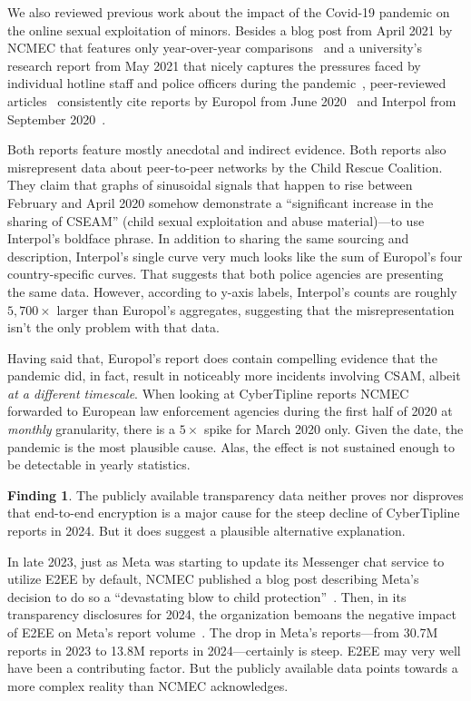 \documentclass[anonymous,nonacm,screen,12pt]{acmart}
\newcommand\V[1]{{#1}}
\newcommand\V[1]{\textsc{\MakeLowercase{#1}}}
\theoremstyle{definition}
\newtheorem{finding}{Finding}
\begin{document}
We also reviewed previous work about the impact of the Covid-19 pandemic on the
online sexual exploitation of minors. Besides a blog post from April 2021 by
\V{NCMEC} that features only year-over-year comparisons~\cite{ODonnell2021} and
a university's research report from May 2021 that nicely captures the pressures
faced by individual hotline staff and police officers during the
pandemic~\cite{SalterWong2021}, peer-reviewed articles~\cite{Dabrowska2021,
Haney2021b, SalterWoodlockea2023} consistently cite reports by Europol from June
2020~\cite{Europol2020} and Interpol from September 2020~\cite{Interpol2020}.

Both reports feature mostly anecdotal and indirect evidence. Both reports also
misrepresent data about peer-to-peer networks by the Child Rescue Coalition.
They claim that graphs of sinusoidal signals that happen to rise between
February and April 2020 somehow demonstrate a ``significant increase in the
sharing of \V{CSEAM}'' (child sexual exploitation and abuse material)---to use
Interpol's boldface phrase. In addition to sharing the same sourcing and
description, Interpol's single curve very much looks like the sum of Europol's
four country-specific curves. That suggests that both police agencies are
presenting the same data. However, according to y-axis labels, Interpol's counts
are roughly $5,700\times$ larger than Europol's aggregates, suggesting that the
misrepresentation isn't the only problem with that data.

Having said that, Europol's report does contain compelling evidence that the
pandemic did, in fact, result in noticeably more incidents involving \V{CSAM},
albeit \emph{at a different timescale}. When looking at CyberTipline reports
\V{NCMEC} forwarded to European law enforcement agencies during the first half
of 2020 at \emph{monthly} granularity, there is a $5\times$ spike for March 2020
only. Given the date, the pandemic is the most plausible cause. Alas, the effect
is not sustained enough to be detectable in yearly statistics.


\begin{finding}
The publicly available transparency data neither proves nor disproves that
end-to-end encryption is a major cause for the steep decline of CyberTipline
reports in 2024. But it does suggest a plausible alternative explanation.
\end{finding}

\noindent{}In late 2023, just as Meta was starting to update its Messenger chat
service to utilize \V{E2EE} by default, \V{NCMEC} published a blog post
describing Meta's decision to do so a ``devastating blow to child
protection''~\cite{NCMEC2023}. Then, in its transparency disclosures for 2024,
the organization bemoans the negative impact of \V{E2EE} on Meta's report
volume~\cite{NcmecCyberTipline2024, NcmecOjjdp2024}. The drop in Meta's
reports---from 30.7\V{M} reports in 2023 to 13.8\V{M} reports in
2024---certainly is steep. \V{E2EE} may very well have been a contributing
factor. But the publicly available data points towards a more complex reality
than \V{NCMEC} acknowledges.
\end{document}
